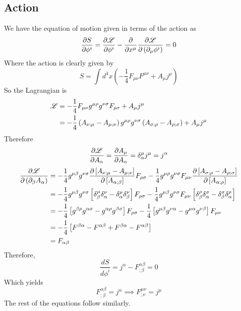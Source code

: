 \documentclass{article}
\begin{document}
 	\subsection{Action}
 	We have the equation of motion given in terms of the action as
 	\begin{equation}
 		\label{eq:eom1b}
 		\frac{\partial S}{\partial \phi^i} = \frac{\partial \mathscr{L}}{\partial \phi^i} - \frac{\partial}{\partial x^\mu} \frac{\partial \mathscr{L}}{\partial \left(\partial_\mu \phi^i\right)} = 0
 	\end{equation}
 	Where the action is clearly given by
 	\begin{equation}
 		\label{eq:Action}
 		S = \int d^4 x \left( -\frac14 F_{\mu\nu} F^{\mu\nu} + A_{\mu} j^\mu \right)
 	\end{equation}
 	So the Lagrangian is
 	\begin{align}
 		\label{eq:Lagrangian}\nonumber
 		\mathscr{L} &= - \frac14 F_{\mu\nu} g^{\mu\rho} g^{\nu\sigma} F_{\rho\sigma} + A_{\mu} j^\mu \\
 		&= -\frac14 \left( A_{\nu;\mu} - A_{\mu;\nu}\right)g^{\mu\rho} g^{\nu\sigma} \left( A_{\sigma;\rho} - A_{\rho;\sigma}\right) + A_\mu j^\mu
 	\end{align}
 	Therefore
 	$$ \frac{\partial \mathscr{L}}{\partial A_\alpha} = \frac{\partial A_\mu}{\partial A_\alpha} = \delta_{\alpha}^\mu j^\mu = j^\alpha$$
 	\begin{align*}
 		\frac{\partial \mathscr{L}}{\partial \left( \partial_\beta A_\alpha \right)} &= -\frac14 g^{\mu\beta} g^{\nu\sigma} \frac{\partial \left[ A_{\nu;\mu} - A_{\mu;\nu}\right]}{\partial \left[ A_{\alpha;\beta}\right]} F_{\rho\sigma} -\frac14 g^{\mu\rho} g^{\nu\sigma}F_{\mu\nu} \frac{\partial \left[ A_{\sigma;\rho} - A_{\rho;\sigma}\right]}{\partial \left[ A_{\alpha;\rho}\right]} \\
 		&= -\frac14 g^{\mu\beta} g^{\nu\sigma} \left[ \delta_\beta^\mu \delta_\alpha^\nu - \delta_\alpha^\mu \delta_\beta^\nu \right] F_{\rho\sigma} - \frac14 g^{\mu\beta} g^{\nu\sigma} F_{\mu\nu}  \left[ \delta_\beta^\rho \delta_\alpha^\sigma - \delta_\beta^\sigma \delta_\alpha^\rho \right] \\
 		&= -\frac14 \left[ g^{\beta\rho} g^{\alpha \sigma} - g^{\alpha\rho} g^{\beta\sigma}\right] F_{\rho\sigma} - \frac14 \left[ g^{\mu\beta} g^{\nu\alpha} - g^{\mu\alpha} g^{\nu\beta} \right] F_{\mu\nu} \\
 		&= -\frac14 \left[ F^{\beta\alpha} - F^{\alpha \beta} + F^{\beta\alpha}  - F^{\alpha \beta}\right]\\
 		&= F_{\alpha \beta}
 	\end{align*}
 	Therefore, 
 	$$ \frac{d S}{d \phi^i} = j^\alpha - F_{;\beta}^{\alpha\beta} = 0$$
 	Which yields
 	\begin{equation}
 		\label{ans:1.b}
 		\boxed{F_{;\beta}^{\alpha\beta} = j^\alpha \implies F_{;\nu}^{\mu\nu} = j^\mu} 
 	\end{equation}
 	The rest of the equations follow similarly.
 	
\end{document}
